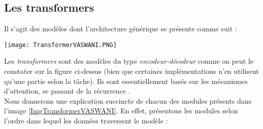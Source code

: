 \subsection{Les transformers}
Il s'agit des modèles dont l'architecture générique se présente comme suit :\newpage
\begin{center}
\texttt{[image: TransformerVASWANI.PNG]}
\label{ImgTransformerVASWANI}
\end{center}
Les \textit{transformers} sont des modèles du type \textit{encodeur-décodeur} comme on peut le constater sur la figure ci-dessus (bien que certaines implémentations n'en utilisent qu'une partie selon la tâche). Ils sont essentiellement basés sur les mécanismes d'attention, se passant de la récurrence \cite{geron2020deep,ganegedara2018natural}.\\
Nous donnerons une explication succincte de chacun des modules présents dans l'image \ref{ImgTransformerVASWANI}. En effet, présentons les modules selon l'ordre dans lequel les données traversent le modèle :
